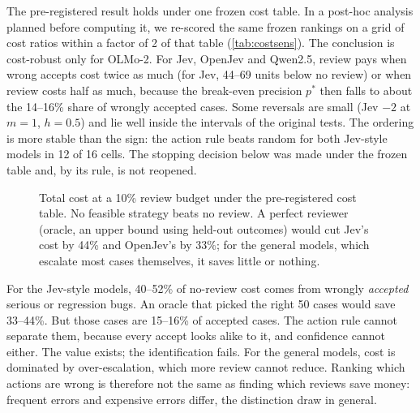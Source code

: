 The pre-registered result holds
under one frozen cost table. In a post-hoc analysis planned before
computing it, we re-scored the same frozen rankings on a grid of cost
ratios within a factor of 2 of that table (\cref{tab:costsens}). The
conclusion is cost-robust only for OLMo-2. For Jev, OpenJev and Qwen2.5,
review pays when wrong accepts cost twice as much (for Jev, 44--69 units
below no review) or when review costs half as much, because the
break-even precision $p^{*}$ then falls to about the 14--16\% share of
wrongly accepted cases. Some reversals are small (Jev $-2$ at $m = 1$,
$h = 0.5$) and lie well inside the intervals of the original tests. The
ordering is more stable than the sign: the action rule beats random for
both Jev-style models in 12 of 16 cells. The stopping decision below was
made under the frozen table and, by its rule, is not reopened.

\begin{figure}[t]
\centering
{}
\caption{Total cost at a 10\% review budget under the pre-registered
cost table. No feasible strategy beats no review. A perfect reviewer (oracle, an upper bound using held-out
outcomes) would cut Jev's cost by 44\% and OpenJev's by 33\%; for the
general models, which escalate most cases themselves, it saves little or
nothing.}
\label{fig:intervention}
\end{figure}

 For the Jev-style models, 40--52\% of no-review
cost comes from wrongly \emph{accepted} serious or regression bugs. An
oracle that picked the right 50 cases would save 33--44\%. But those cases
are 15--16\% of accepted cases. The action rule cannot separate them,
because every accept looks alike to it, and confidence cannot either. The
value exists; the identification fails. For the general models, cost is
dominated by over-escalation, which more review cannot reduce. Ranking
which actions are wrong is therefore not the same as finding which
reviews save money: frequent errors and expensive errors differ, the
distinction \citet{park2026riskreview} draw in general.

